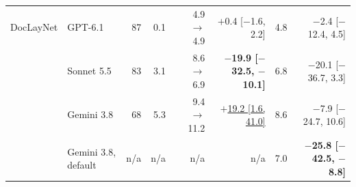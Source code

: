 \begin{table}[tp]
\begin{tabular}{@{}llrrrrrr@{}}
\midrule
DocLayNet & GPT-6.1 & 87 & 0.1 & 4.9 $\to$ 4.9 & $+$0.4 [$-$1.6, 2.2] & 4.8 & $-$2.4 [$-$12.4, 4.5] \\
 & Sonnet 5.5 & 83 & 3.1 & 8.6 $\to$ 6.9 & {\bfseries\boldmath $-$19.9 [$-$32.5, $-$10.1]} & 6.8 & $-$20.1 [$-$36.7, 3.3] \\
 & Gemini 3.8 & 68 & 5.3 & 9.4 $\to$ 11.2 & \underline{$+$19.2 [1.6, 41.0]} & 8.6 & $-$7.9 [$-$24.7, 10.6] \\
 & Gemini 3.8, default & n/a & n/a & n/a & n/a & 7.0 & {\bfseries\boldmath $-$25.8 [$-$42.5, $-$8.8]} \\
\bottomrule\end{tabular}\end{table}

